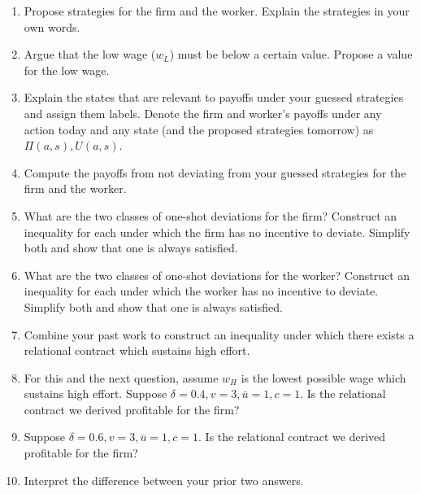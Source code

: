\documentclass{article}
\begin{document}
\begin{enumerate}
   
\item Propose strategies for the firm and the worker. Explain the strategies in your own words.




\item Argue that the low wage ($w_L$) must be below a certain value. Propose a value for the low wage.

\item Explain the states that are relevant to payoffs under your guessed strategies and assign them labels. Denote the firm and worker's payoffs under any action today and any state (and the proposed strategies tomorrow) as $\Pi(a,s), U(a,s)$.


\item Compute the payoffs from not deviating from your guessed strategies for the firm and the worker.



\item What are the two classes of one-shot deviations for the firm? Construct an inequality for each under which the firm has no incentive to deviate. Simplify both and show that one is always satisfied.


\item What are the two classes of one-shot deviations for the worker? Construct an inequality for each under which the worker has no incentive to deviate. Simplify both and show that one is always satisfied.



   \item Combine your past work to construct an inequality under which there exists a relational contract which sustains high effort.


    \item For this and the next question,    assume $w_H$ is the lowest possible wage which sustains high effort.  Suppose $\delta = 0.4, v=3, \bar u = 1, c=1$. Is the relational contract we derived profitable for the firm?


    
    \item Suppose $\delta = 0.6, v=3, \bar u= 1,c=1$. Is the relational contract we derived profitable for the firm?
    

    
    
    \item Interpret the difference between your prior two answers.


    
\end{enumerate}
\end{document}
